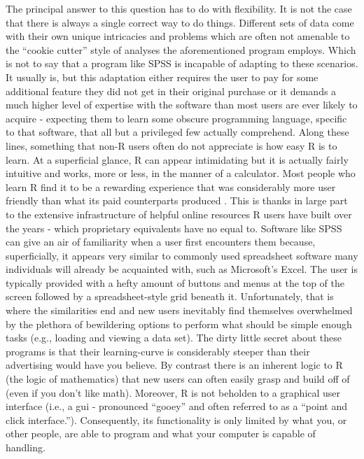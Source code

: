 The principal answer to this question has to do with flexibility. It is not the case that there is always a single correct way to do things.  Different sets of data come with their own unique intricacies and problems which are often not amenable to the ``cookie cutter'' style of analyses the aforementioned program employs. Which is not to say that a program like SPSS is incapable of adapting to these scenarios. It usually is, but this adaptation either requires the user to pay for some additional feature they did not get in their original purchase or it demands a much higher level of expertise with the software than most users are ever likely to acquire - expecting them to learn some obscure programming language, specific to that software, that all but a privileged few actually comprehend. Along these lines, something that non-R users often do not appreciate is how easy R is to learn. At a superficial glance, R can appear intimidating but it is actually fairly intuitive and works, more or less, in the manner of a calculator.  Most people who learn R find it to be a rewarding experience that was considerably more user friendly than what its paid counterparts produced \parencite{Bro}. This is thanks in large part to the extensive infrastructure of helpful online resources R users have built over the years - which proprietary equivalents have no equal to. Software like SPSS can give an air of familiarity when a user first encounters them because, superficially, it appears very similar to commonly used spreadsheet software many individuals will already be acquainted with, such as Microsoft's Excel. The user is typically provided with a hefty amount of buttons and menus at the top of the screen followed by a spreadsheet-style grid beneath it. Unfortunately, that is where the similarities end and new users inevitably find themselves overwhelmed by the plethora of bewildering options to perform what should be simple enough tasks (e.g., loading and viewing a data set). The dirty little secret about these programs is that their learning-curve is considerably steeper than their advertising would have you believe.  By contrast there is an inherent logic to R (the logic of mathematics) that new users can often easily grasp and build off of (even if you don't like math). Moreover, R is not beholden to a graphical user interface (i.e., a gui - pronounced ``gooey'' and often referred to as a ``point and click interface.''). Consequently, its functionality is only limited by what you, or other people, are able to program and what your computer is capable of handling.


